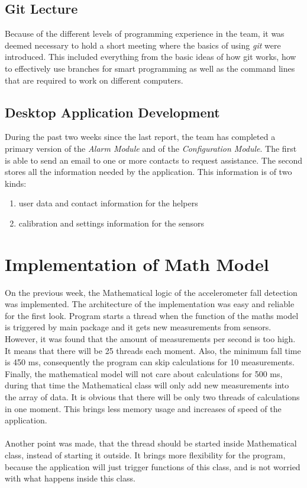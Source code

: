 \documentclass[conference,12pt]{IEEETran}
\begin{document}
\subsection{Git Lecture}
Because of the different levels of programming experience in the team, it was deemed necessary to hold a short meeting where the basics of using \textit{git} were introduced. This included everything from the basic ideas of how git works, how to effectively use branches for smart programming as well as the command lines that are required to work on different computers.

\subsection{Desktop Application Development}
During the past two weeks since the last report, the team has completed a primary version of the \textit{Alarm Module} and of the \textit{Configuration Module}. The first is able to send an email to one or more contacts to request assistance. The second stores all the information needed by the application. This information is of two kinds:  
\begin{enumerate}
	\item user data and contact information for the helpers
	\item calibration and settings information for the sensors
\end{enumerate}

\section{Implementation of Math Model}
On the previous week, the Mathematical logic of the accelerometer fall detection was implemented. The architecture of the implementation was easy and reliable for the first look. Program starts a thread when the function of the maths model is triggered by main package and it gets new measurements from sensors. However, it was found that the amount of measurements per second is too high. It means that there will be 25 threads each moment. Also, the minimum fall time is 450 ms, consequently the program can skip calculations for 10 measurements. Finally, the mathematical model will not care about calculations for 500 ms, during that time the Mathematical class will only add new measurements into the array of data. It is obvious that there will be only two threads of calculations in one moment. This brings less memory usage and increases of speed of the application.\\\\
Another point was made, that the thread should be started inside Mathematical class, instead of starting it outside. It brings more flexibility for the program, because the application will just trigger functions of this class, and is not worried with what happens inside this class.
\end{document}
